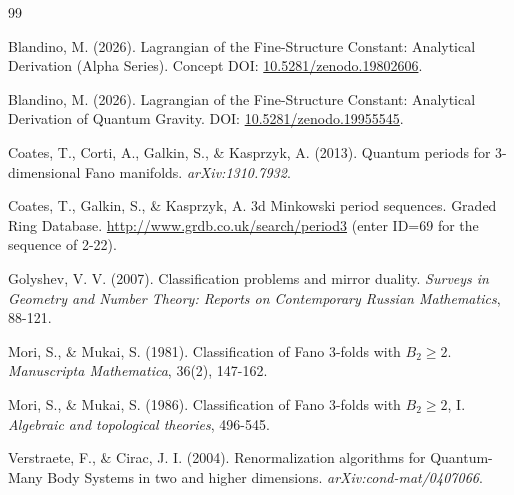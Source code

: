 \documentclass[12pt]{article}
\begin{document}

\begin{thebibliography}{99}

Blandino, M. (2026). Lagrangian of the Fine-Structure Constant:
Analytical Derivation (Alpha Series).
Concept DOI: \href{https://doi.org/10.5281/zenodo.19802606}{10.5281/zenodo.19802606}.

Blandino, M. (2026). Lagrangian of the Fine-Structure Constant:
Analytical Derivation of Quantum Gravity.
DOI: \href{https://doi.org/10.5281/zenodo.19955545}{10.5281/zenodo.19955545}.

Coates, T., Corti, A., Galkin, S., \& Kasprzyk, A. (2013).
Quantum periods for 3-dimensional Fano manifolds.
\textit{arXiv:1310.7932}.

Coates, T., Galkin, S., \& Kasprzyk, A.
3d Minkowski period sequences.
Graded Ring Database.
\url{http://www.grdb.co.uk/search/period3}
(enter ID=69 for the sequence of 2-22).

Golyshev, V. V. (2007).
Classification problems and mirror duality.
\textit{Surveys in Geometry and Number Theory: Reports on Contemporary
Russian Mathematics}, 88-121.

Mori, S., \& Mukai, S. (1981).
Classification of Fano 3-folds with $B_2 \ge 2$.
\textit{Manuscripta Mathematica}, 36(2), 147-162.

Mori, S., \& Mukai, S. (1986).
Classification of Fano 3-folds with $B_2 \ge 2$, I.
\textit{Algebraic and topological theories}, 496-545.

Verstraete, F., \& Cirac, J. I. (2004).
Renormalization algorithms for Quantum-Many Body Systems
in two and higher dimensions.
\textit{arXiv:cond-mat/0407066}.

\end{thebibliography}
\end{document}
